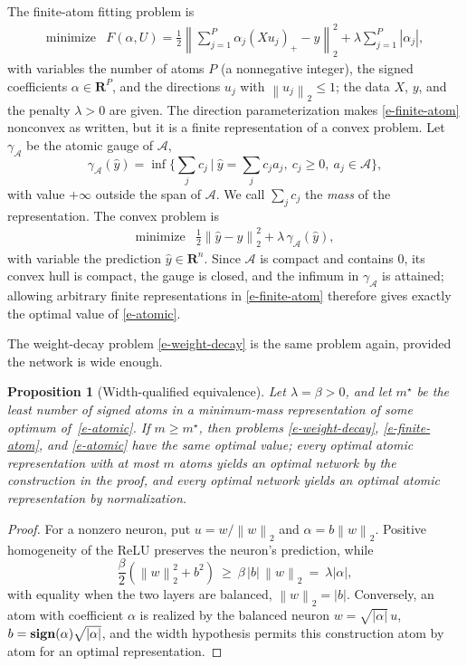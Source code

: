 \documentclass[12pt]{article}
\theoremstyle{plain}
\newtheorem{proposition}[theorem]{Proposition}
\theoremstyle{definition}
\newcommand{\reals}{\mathbf{R}}
\newcommand{\A}{\mathcal{A}}
\newcommand{\norm}[1]{\left\lVert #1\right\rVert}
\newcommand{\relu}[1]{\left(#1\right)_+}
\newcommand{\yhat}{\widehat y}
\begin{document}
The finite-atom fitting problem is
\begin{equation}\label{e-finite-atom}
\begin{array}{ll}
\mbox{minimize} & \displaystyle
  F(\alpha,U)=\frac12\norm{\sum_{j=1}^P\alpha_j\relu{Xu_j}-y}_2^2
  +\lambda\sum_{j=1}^P|\alpha_j|,
\end{array}
\end{equation}
with variables the number of atoms $P$ (a nonnegative integer), the signed
coefficients $\alpha\in\reals^P$, and the directions $u_j$ with
$\norm{u_j}_2\le1$; the data $X$, $y$, and the penalty $\lambda>0$ are given.
The direction parameterization makes \eqref{e-finite-atom} nonconvex as
written, but it is a finite representation of a convex problem. Let
$\gamma_{\A}$ be the atomic gauge of $\A$,
\[
  \gamma_{\A}(\yhat)
  =\inf\Big\{\sum_jc_j \ \Big|\ \yhat=\sum_jc_ja_j,\ c_j\ge0,\ a_j\in\A\Big\},
\]
with value $+\infty$ outside the span of $\A$. We call $\sum_j c_j$ the
\emph{mass} of the representation. The convex problem is
\begin{equation}\label{e-atomic}
\begin{array}{ll}
\mbox{minimize} & \frac12\norm{\yhat-y}_2^2+\lambda\,\gamma_{\A}(\yhat),
\end{array}
\end{equation}
with variable the prediction $\yhat\in\reals^n$. Since $\A$ is compact and
contains $0$, its convex hull is compact, the gauge is closed, and the infimum
in $\gamma_{\A}$ is attained; allowing arbitrary finite representations in
\eqref{e-finite-atom} therefore gives exactly the optimal value of
\eqref{e-atomic}.

The weight-decay problem \eqref{e-weight-decay} is the same problem again,
provided the network is wide enough.

\begin{proposition}[Width-qualified equivalence]\label{p-equivalence}
Let $\lambda=\beta>0$, and let $m^\star$ be the least number of signed atoms in
a minimum-mass representation of some optimum of~\eqref{e-atomic}. If $m\ge
m^\star$, then problems \eqref{e-weight-decay}, \eqref{e-finite-atom}, and
\eqref{e-atomic} have the same optimal value; every optimal atomic
representation with at most $m$ atoms yields an optimal network by the
construction in the proof, and every optimal network yields an optimal atomic
representation by normalization.
\end{proposition}

\begin{proof}
For a nonzero neuron, put $u=w/\norm w_2$ and $\alpha=b\norm w_2$. Positive
homogeneity of the ReLU preserves the neuron's prediction, while
\[
  \frac\beta2\left(\norm w_2^2+b^2\right)\ \ge\ \beta\,|b|\,\norm w_2
  \ =\ \lambda|\alpha|,
\]
with equality when the two layers are balanced, $\norm w_2=|b|$. Conversely,
an atom with coefficient $\alpha$ is realized by the balanced neuron
$w=\sqrt{|\alpha|}\,u$, $b=\mathop{\bf sign}(\alpha)\sqrt{|\alpha|}$, and the
width hypothesis permits this construction atom by atom for an optimal
representation.
\end{proof}
\end{document}

